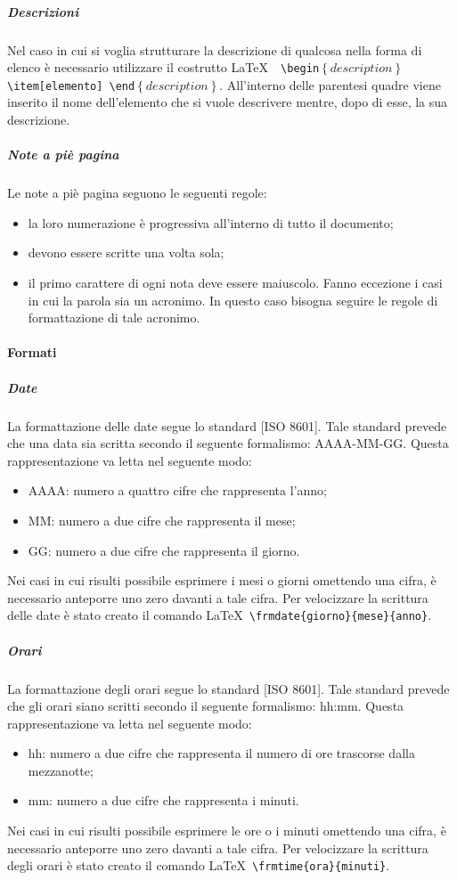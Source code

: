 \documentclass[../NormeProgetto.text]{subfiles}
\begin{document}
			
			\subparagraph{Descrizioni}
				Nel caso in cui si voglia strutturare la descrizione di qualcosa nella forma di elenco è necessario utilizzare il costrutto \LaTeX\ \texttt{ \textbackslash begin$\left\{description\right\}$ \textbackslash item[elemento] \textbackslash end$\left\{description\right\}$}. All'interno delle parentesi quadre viene inserito il nome dell'elemento che si vuole descrivere mentre, dopo di esse, la sua descrizione.					
			
			\subparagraph{Note a piè pagina}
				Le note a piè pagina seguono le seguenti regole:
				\begin{itemize}
					\item la loro numerazione è progressiva all'interno di tutto il documento;
					\item devono essere scritte una volta sola;
					\item il primo carattere di ogni nota deve essere maiuscolo. Fanno eccezione i casi in cui la parola sia un acronimo. In questo caso bisogna seguire le regole di formattazione di tale acronimo.
				\end{itemize}
			
		\paragraph{Formati}
			\subparagraph{Date}
				La formattazione delle date segue lo standard [ISO 8601]. Tale standard prevede che una data sia scritta secondo il seguente formalismo: AAAA-MM-GG. Questa rappresentazione va letta nel seguente modo:
				\begin{itemize}
					\item AAAA: numero a quattro cifre che rappresenta l'anno;
					\item MM: numero a due cifre che rappresenta il mese;
					\item GG: numero a due cifre che rappresenta il giorno.
				\end{itemize}
				Nei casi in cui risulti possibile esprimere i mesi o giorni omettendo una cifra, è necessario anteporre uno zero davanti a tale cifra. Per velocizzare la scrittura delle date è stato creato il comando \LaTeX\ \texttt{\textbackslash frmdate\{giorno\}\{mese\}\{anno\}}.
			
			\subparagraph{Orari}
				La formattazione degli orari segue lo standard [ISO 8601]. Tale standard prevede che gli orari siano scritti secondo il seguente formalismo: hh:mm. Questa rappresentazione va letta nel seguente modo:
				\begin{itemize}
					\item hh: numero a due cifre che rappresenta il numero di ore trascorse dalla mezzanotte;
					\item mm: numero a due cifre che rappresenta i minuti. 
				\end{itemize}						
				Nei casi in cui risulti possibile esprimere le ore o i minuti omettendo una cifra, è necessario anteporre uno zero davanti a tale cifra. Per velocizzare la scrittura degli orari è stato creato il comando \LaTeX\ \texttt{\textbackslash frmtime\{ora\}\{minuti\}}.
			
\end{document}
